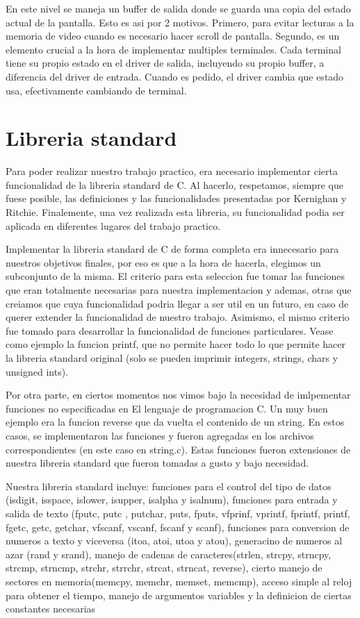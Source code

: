 \documentclass[a4paper,10pt]{article}
\begin{document}
            En este nivel se maneja un buffer de salida donde se guarda una copia del estado actual de la pantalla.
            Esto es asi por 2 motivos.
            Primero, para evitar lecturas a la memoria de video cuando es necesario hacer scroll de pantalla.
            Segundo, es un elemento crucial a la hora de implementar multiples terminales.
            Cada terminal tiene su propio estado en el driver de salida, incluyendo su propio buffer, a diferencia del driver de entrada.
            Cuando es pedido, el driver cambia que estado usa, efectivamente cambiando de terminal.

\section{Libreria standard}
    Para poder realizar nuestro trabajo practico, era necesario implementar cierta funcionalidad de la libreria standard de C. Al hacerlo, respetamos, siempre que fuese posible, las definiciones y las funcionalidades presentadas por Kernighan y Ritchie.
    Finalemente, una vez realizada esta libreria, su funcionalidad podia ser aplicada en diferentes lugares del trabajo practico.

    Implementar la libreria standard de C de forma completa era innecesario para nuestros objetivos finales, por eso es que a la hora de hacerla, elegimos un subconjunto de la misma. El criterio para esta seleccion fue tomar las funciones que eran totalmente necesarias para nuestra implementacion y ademas, otras que creiamos que cuya funcionalidad podria llegar a ser util en un futuro, en caso de querer extender la funcionalidad de nuestro trabajo.
    Asimismo, el mismo criterio fue tomado para desarrollar la funcionalidad de funciones particulares. Vease como ejemplo la funcion printf, que no permite hacer todo lo que permite hacer la libreria standard original (solo se pueden imprimir integers, strings, chars y unsigned ints).

    Por otra parte, en ciertos momentos nos vimos bajo la necesidad de imlpementar funciones no especificadas en El lenguaje de programacion C. Un muy buen ejemplo era la funcion reverse que da vuelta el contenido de un string. En estos casos, se implementaron las funciones y fueron agregadas en los archivos correspondientes (en este caso en string.c). Estas funciones fueron extensiones de nuestra libreria standard que fueron tomadas a gusto y bajo necesidad.

    Nuestra libreria standard incluye: funciones para el control del tipo de datos (isdigit, isspace, islower, isupper, isalpha y isalnum), funciones para entrada y salida de texto (fputc, putc , putchar, puts, fputs, vfprinf, vprintf, fprintf, printf, fgetc, getc, getchar, vfscanf, vscanf, fscanf y scanf), funciones para conversion de numeros a texto y viceversa (itoa, atoi, utoa y atou), generacino de numeros al azar (rand y srand), manejo de cadenas de caracteres(strlen, strcpy, strncpy, strcmp, strncmp, strchr, strrchr, strcat, strncat, reverse), cierto manejo de sectores en memoria(memcpy, memchr, memset, memcmp), acceso simple al reloj para obtener el tiempo, manejo de argumentos variables y la definicion de ciertas constantes necesarias
\end{document}
